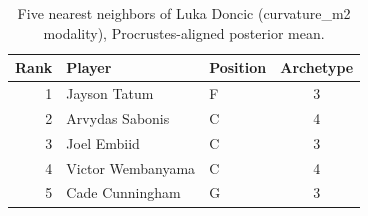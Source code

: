 \begin{table}[htbp]
  \centering\small
  \begin{tabular}{rllc}
    \toprule
    Rank & Player & Position & Archetype \\
    \midrule
    1 & Jayson Tatum & F & 3 \\
    2 & Arvydas Sabonis & C & 4 \\
    3 & Joel Embiid & C & 3 \\
    4 & Victor Wembanyama & C & 4 \\
    5 & Cade Cunningham & G & 3 \\
    \bottomrule
  \end{tabular}
  \caption{Five nearest neighbors of Luka Doncic (curvature_m2 modality), Procrustes-aligned posterior mean.}
  \label{tab:Luka_Doncic_neighbors_curvature_m2}
\end{table}

